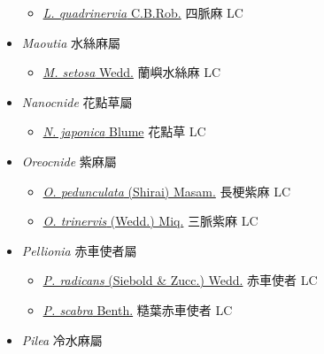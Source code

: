 \begin{itemize}
  \begin{itemize}
        \item[] \href{http://www.theplantlist.org/tpl1.1/search?q=Leucosyke+quadrinervia}{\textit{L. quadrinervia} C.B.Rob.}   四脈麻 LC
  \end{itemize}
 \item[] \textit{Maoutia} 水絲麻屬
                    
  \begin{itemize}
        \item[] \href{http://www.theplantlist.org/tpl1.1/search?q=Maoutia+setosa}{\textit{M. setosa} Wedd.}   蘭嶼水絲麻 LC
  \end{itemize}
 \item[] \textit{Nanocnide} 花點草屬
                    
  \begin{itemize}
        \item[] \href{http://www.theplantlist.org/tpl1.1/search?q=Nanocnide+japonica}{\textit{N. japonica} Blume}   花點草 LC
  \end{itemize}
 \item[] \textit{Oreocnide} 紫麻屬
                    
  \begin{itemize}
        \item[] \href{http://www.theplantlist.org/tpl1.1/search?q=Oreocnide+pedunculata}{\textit{O. pedunculata} (Shirai) Masam.}   長梗紫麻 LC
        \item[] \href{http://www.theplantlist.org/tpl1.1/search?q=Oreocnide+trinervis}{\textit{O. trinervis} (Wedd.) Miq.}   三脈紫麻 LC
  \end{itemize}
 \item[] \textit{Pellionia} 赤車使者屬
                    
  \begin{itemize}
        \item[] \href{http://www.theplantlist.org/tpl1.1/search?q=Pellionia+radicans}{\textit{P. radicans} (Siebold \& Zucc.) Wedd.}   赤車使者 LC
        \item[] \href{http://www.theplantlist.org/tpl1.1/search?q=Pellionia+scabra}{\textit{P. scabra} Benth.}   糙葉赤車使者 LC
  \end{itemize}
 \item[] \textit{Pilea} 冷水麻屬
                    

\end{itemize}
